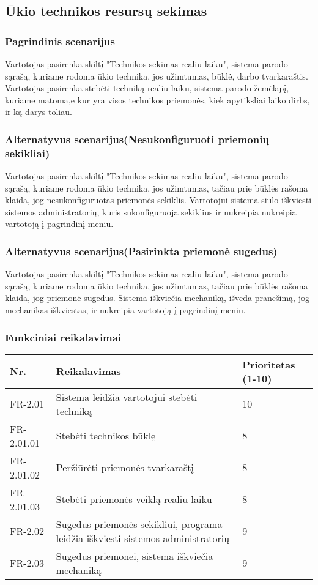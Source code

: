 \documentclass[oneside]{VUMIFPSkursinis}
\begin{document}
\subsection{Ūkio technikos resursų sekimas}
\subsubsection{Pagrindinis scenarijus}
	Vartotojas pasirenka skiltį "Technikos sekimas realiu laiku", sistema parodo sąrašą, kuriame rodoma ūkio technika, jos užimtumas, būklė, darbo tvarkaraštis. Vartotojas pasirenka stebėti techniką realiu laiku, sistema parodo žemėlapį, kuriame matoma,e kur yra visos technikos priemonės, kiek apytiksliai laiko dirbs, ir ką darys toliau.
\subsubsection{Alternatyvus scenarijus(Nesukonfiguruoti priemonių sekikliai)}
	Vartotojas pasirenka skiltį "Technikos sekimas realiu laiku", sistema parodo sąrašą, kuriame rodoma ūkio technika, jos užimtumas, tačiau prie būklės rašoma klaida, jog nesukonfiguruotas priemonės sekiklis. Vartotojui sistema siūlo iškviesti sistemos administratorių, kuris sukonfiguruoja sekiklius ir nukreipia nukreipia vartotoją į pagrindinį meniu.
\subsubsection{Alternatyvus scenarijus(Pasirinkta priemonė sugedus)}
	Vartotojas pasirenka skiltį "Technikos sekimas realiu laiku", sistema parodo sąrašą, kuriame rodoma ūkio technika, jos užimtumas, tačiau prie būklės rašoma klaida, jog priemonė sugedus. Sistema iškviečia mechaniką, išveda pranešimą, jog mechanikas iškviestas, ir nukreipia vartotoją į pagrindinį meniu.
\subsubsection{Funkciniai reikalavimai}
\begin{table}[htbp]
	\begin{tabularx}{1\textwidth}{ |P{2.5cm}|X|P{3cm }| }  \hline
           	Nr. & Reikalavimas &  Prioritetas (1-10)  \\   \hline 
         	FR-2.01 & Sistema leidžia vartotojui stebėti techniką & 10  \\   \hline
		FR-2.01.01 & Stebėti technikos būklę & 8 \\ \hline
		FR-2.01.02 & Peržiūrėti priemonės tvarkaraštį & 8 \\ \hline
		FR-2.01.03 & Stebėti priemonės veiklą realiu laiku & 8 \\ \hline
        	FR-2.02 & Sugedus priemonės sekikliui, programa leidžia iškviesti sistemos administratorių & 9   \\   \hline
		FR-2.03 & Sugedus priemonei, sistema iškviečia mechaniką & 9 \\ \hline
	\end{tabularx}
\end{table}
\end{document}
